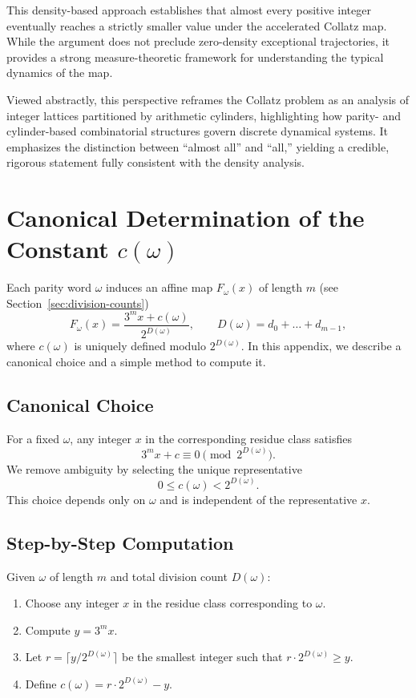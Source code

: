 \documentclass[12pt, oneside]{article}   	%
\numberwithin{equation}{section}          %
\theoremstyle{definition}
\begin{document}
This density-based approach establishes that almost every positive integer eventually
reaches a strictly smaller value under the accelerated Collatz map. While the argument
does not preclude zero-density exceptional trajectories, it provides a strong
measure-theoretic framework for understanding the typical dynamics of the map.

Viewed abstractly, this perspective reframes the Collatz problem as an analysis of
integer lattices partitioned by arithmetic cylinders, highlighting how parity-
and cylinder-based combinatorial structures govern discrete dynamical systems. It
emphasizes the distinction between “almost all” and “all,” yielding a credible,
rigorous statement fully consistent with the density analysis.


\newpage
\appendix
\section{Canonical Determination of the Constant \(c(\omega)\)}
\label{app:canonical-c}

Each parity word \(\omega\) induces an affine map \(F_\omega(x)\) of length $m$
(see Section~\ref{sec:division-counts})
\[
F_\omega(x) = \frac{3^m x + c(\omega)}{2^{D(\omega)}}, \qquad D(\omega) = d_0 + \dots + d_{m-1},
\]
where \(c(\omega)\) is uniquely defined modulo \(2^{D(\omega)}\). In this appendix,
we describe a canonical choice and a simple method to compute it.

\subsection{Canonical Choice}

For a fixed \(\omega\), any integer \(x\) in the corresponding residue class satisfies
\[
3^m x + c \equiv 0 \pmod{2^{D(\omega)}}.
\]
We remove ambiguity by selecting the unique representative
\[
0 \le c(\omega) < 2^{D(\omega)}.
\]
This choice depends only on \(\omega\) and is independent of the representative \(x\).

\subsection{Step-by-Step Computation}

Given \(\omega\) of length \(m\) and total division count \(D(\omega)\):

\begin{enumerate}
\item Choose any integer \(x\) in the residue class corresponding to \(\omega\).  
\item Compute \(y = 3^m x\).  
\item Let \(r = \lceil y / 2^{D(\omega)} \rceil\) be the smallest integer such that \(r \cdot 2^{D(\omega)} \ge y\).  
\item Define \(c(\omega) = r \cdot 2^{D(\omega)} - y\).  
\end{enumerate}
\end{document}
